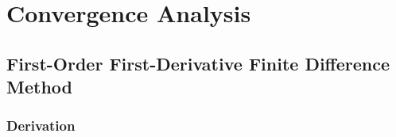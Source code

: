\documentclass[10pt, reqno]{article}		%
\numberwithin{equation}{section}
\begin{document}
%
%
%
%
%
%

\newpage

\section{Convergence Analysis}

\subsection{First-Order First-Derivative Finite Difference Method}

\subsubsection{Derivation}
\end{document}
